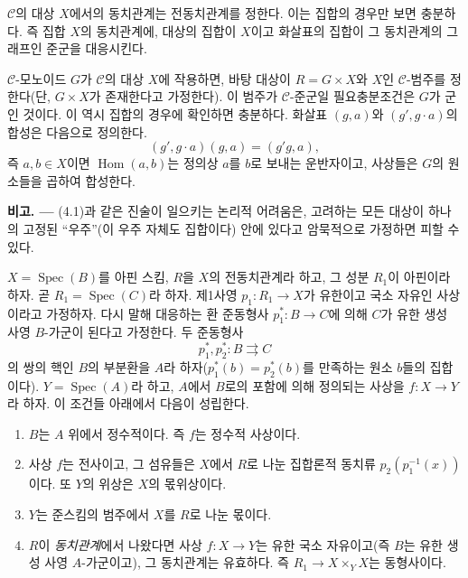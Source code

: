 $\mathcal C$의 대상 $X$에서의 동치관계는 전동치관계를 정한다. 이는
집합의 경우만 보면 충분하다. 즉 집합 $X$의 동치관계에, 대상의
집합이 $X$이고 화살표의 집합이 그 동치관계의 그래프인 준군을 대응시킨다.

$\mathcal C$-모노이드 $G$가 $\mathcal C$의 대상 $X$에 작용하면, 바탕
대상이 $R=G\times X$와 $X$인 $\mathcal C$-범주를 정한다(단,
$G\times X$가 존재한다고 가정한다). 이 범주가 $\mathcal C$-준군일
필요충분조건은 $G$가 군인 것이다. 이 역시 집합의 경우에 확인하면
충분하다. 화살표 $(g,a)$와 $(g',g\cdot a)$의 합성은 다음으로
정의한다.
\[
  (g',g\cdot a)(g,a)=(g'g,a),
\]
즉 $a,b\in X$이면 $\operatorname{Hom}(a,b)$는 정의상 $a$를 $b$로 보내는
운반자이고, 사상들은 $G$의 원소들을 곱하여 합성한다.

\medskip
\noindent\textbf{비고. ---} (4.1)과 같은 진술이 일으키는 논리적 어려움은,
고려하는 모든 대상이 하나의 고정된 “우주”(이 우주 자체도 집합이다) 안에
있다고 암묵적으로 가정하면 피할 수 있다.


 $X=\operatorname{Spec}(B)$를 아핀 스킴, $R$을 $X$의
전동치관계라 하고, 그 성분 $R_1$이 아핀이라 하자. 곧
$R_1=\operatorname{Spec}(C)$라 하자. 제1사영 $p_1:R_1\to X$가 유한이고
국소 자유인 사상이라고 가정하자. 다시 말해 대응하는 환 준동형사
$p_1^*:B\to C$에 의해 $C$가 유한 생성 사영 $B$-가군이 된다고
가정한다. 두 준동형사
\[
  p_1^*,p_2^*:B\rightrightarrows C
\]
의 쌍의 핵인 $B$의 부분환을 $A$라 하자($p_1^*(b)=p_2^*(b)$를 만족하는
원소 $b$들의 집합이다). $Y=\operatorname{Spec}(A)$라 하고, $A$에서 $B$로의
포함에 의해 정의되는 사상을 $f:X\to Y$라 하자. 이 조건들 아래에서
다음이 성립한다.
\begin{enumerate}
\item[(i)] $B$는 $A$ 위에서 정수적이다. 즉 $f$는 정수적 사상이다.

\item[(ii)] 사상 $f$는 전사이고, 그 섬유들은 $X$에서 $R$로 나눈
집합론적 동치류
$p_2\allowbreak(p_1^{-1}(x))$이다. 또 $Y$의 위상은 $X$의 몫위상이다.

\item[(iii)] $Y$는 준스킴의 범주에서 $X$를 $R$로 나눈 몫이다.

\item[(iv)] $R$이 \emph{동치관계}에서 나왔다면 사상 $f:X\to Y$는
유한 국소 자유이고(즉 $B$는 유한 생성 사영 $A$-가군이고), 그
동치관계는 유효하다. 즉 $R_1\to X\times_Y X$는 동형사이다.
\end{enumerate}

